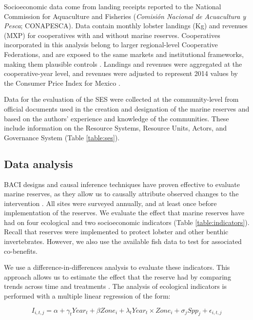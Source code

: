 \documentclass{frontiersSCNS}
\begin{document}
Socioeconomic data come from landing receipts reported to the National
Commission for Aquaculture and Fisheries (\emph{Comisión Nacional de
Acuacultura y Pesca}; CONAPESCA). Data contain monthly lobster landings
(Kg) and revenues (MXP) for cooperatives with and without marine
reserves. Cooperatives incorporated in this analysis belong to larger
regional-level Cooperative Federations, and are exposed to the same
markets and institutional frameworks, making them plausible controls
\citep{mccay_2017,ayer_2018}. Landings and revenues were aggregated at
the cooperative-year level, and revenues were adjusted to represent 2014
values by the Consumer Price Index for Mexico \citep{oecd_2017-VV}.

Data for the evaluation of the SES were collected at the community-level
from official documents used in the creation and designation of the
marine reserves
\citep{dof_website_2012,dof_website_2013,dof_website_2018} and based on
the authors' experience and knowledge of the communities. These include
information on the Resource Systems, Resource Units, Actors, and
Governance System (Table \ref{table:ses}).

\hypertarget{data-analysis}{%
\subsection{Data analysis}\label{data-analysis}}

BACI designs and causal inference techniques have proven effective to
evaluate marine reserves, as they allow us to causally attribute
observed changes to the intervention
\citep{francinifilho_2008,moland_2013,Villasenor-Derbez_2018}. All sites
were surveyed annually, and at least once before implementation of the
reserves. We evaluate the effect that marine reserves have had on four
ecological and two socioeconomic indicators (Table
\ref{table:indicators}). Recall that reserves were implemented to
protect lobster and other benthic invertebrates. However, we also use
the available fish data to test for associated co-benefits.

We use a difference-in-differences analysis to evaluate these
indicators. This approach allows us to estimate the effect that the
reserve had by comparing trends across time and treatments
\citep{moland_2013-VP,Villasenor-Derbez_2018}. The analysis of
ecological indicators is performed with a multiple linear regression of
the form:

\begin{equation}
I_{i,t,j} = \alpha + \gamma_{t} Year_t + \beta Zone_i + \lambda_{t} Year_t\times Zone_i + \sigma_jSpp_j + \epsilon_{i,t,j}
\label{eqn:reg_bio}
\end{equation}
\end{document}
